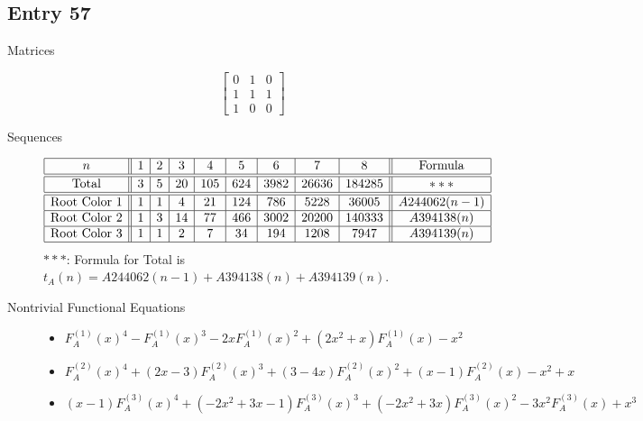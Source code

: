 \documentclass[12pt]{amsart}
\newcommand{\gff}[2]{F_{#2}^{(#1)}(x)}
\newcommand{\gfa}[1]{\gff{#1}{A}}
\begin{document}
\subsection*{Entry 57}
\begin{description}
    \item[Matrices]
    
    \[\begin{bmatrix}
0 & 1 & 0 \\
1 & 1 & 1 \\
1 & 0 & 0
\end{bmatrix}\]
    \item[Sequences]\hspace*{\fill}\vspace{-0.5cm}
    \begin{center}
        \[
        \begin{array}{|c||c|c|c|c|c|c|c|c||c|}\hline
           n  & 1 & 2 & 3 & 4 & 5 & 6 & 7 & 8  & \text{Formula}\\\hline\hline
           \text{Total}  & 3 & 5 & 20 & 105 & 624 & 3982 & 26636 & 184285 & *** \\\hline\hline
           \text{Root Color }1 & 1 & 1 & 4 & 21 & 124 & 786 & 5228 & 36005 & A244062(n-1)\\\hline
           \text{Root Color }2 & 1 & 3 & 14 & 77 & 466 & 3002 & 20200 & 140333 & A394138(n) \\\hline
           \text{Root Color }3 & 1 & 1 & 2 & 7 & 34 & 194 & 1208 & 7947 & A394139(n) \\\hline
        \end{array}
        \]
        $***$: Formula for Total is $t_A(n)=A244062(n-1)+A394138(n)+A394139(n)$.
    \end{center}
    
    \item[Nontrivial Functional Equations]\hspace*{\fill}

    \begin{itemize}
\item $\gfa{1}^4-\gfa{1}^3-2x\gfa{1}^2+(2x^2 + x)\gfa{1}-x^2$

\item $\gfa{2}^4+(2x - 3)\gfa{2}^3+(3 - 4x)\gfa{2}^2+(x - 1)\gfa{2}-x^2 + x$


\item $(x - 1)\gfa{3}^4+(-2x^2 + 3x - 1)\gfa{3}^3+(-2x^2 + 3x)\gfa{3}^2-3x^2\gfa{3}+x^3$



\end{itemize}
\end{description}
\end{document}
